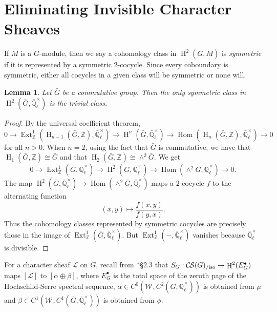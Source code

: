 \documentclass[10pt]{amsart}
\theoremstyle{plain}
\newtheorem{lemma}[theorem]{Lemma}
\theoremstyle{definition}
\newcommand{\ZZ}{{\mathbb{Z}}}
\newcommand{\EE}{\mathbb{\bar Q}_\ell}
\newcommand{\EEx}{\EE^\times}
\newcommand{\Weil}[1]{\mathcal{W}_{#1}}
\DeclareMathOperator{\Hom}{Hom}
\DeclareMathOperator{\Ext}{Ext}
\DeclareMathOperator{\Hh}{H}
\newcommand{\cs}[1]{{\mathcal{#1}}}
\newcommand{\CS}{{\mathcal{C\hskip-0.8pt S}}}
\newcommand{\CSiso}[1]{\CS(#1)_{/\text{iso}}}
\newcommand{\bG}{\bar{G}}
\begin{document}

\section{Eliminating Invisible Character Sheaves}\label{sec:defect}

If $M$ is a $\bG$-module, then we say a cohomology class in $\Hh^2(\bG, M)$ is \emph{symmetric} if it is represented
by a symmetric $2$-cocycle.  Since every coboundary is symmetric, either all cocycles in a given class will be symmetric
or none will.

\begin{lemma} \label{lem:symtriv}
Let $\bG$ be a commutative group.  Then the only symmetric class in $\Hh^2(\bG, \EEx)$ is the trivial class.
\end{lemma}

\begin{proof}
By the universal coefficient theorem,
\[
0 \to \Ext^1_\ZZ(\Hh_{n-1}(\bG, \ZZ), \EEx) \to \Hh^n(\bG, \EEx) \to \Hom(\Hh_n(\bG, \ZZ), \EEx) \to 0
\]
for all $n > 0$.  When $n = 2$, using the fact that $\bG$ is commutative, we have that $\Hh_1(\bG, \ZZ) \cong \bG$
and that $\Hh_2(\bG, \ZZ) \cong \wedge^2 \bG$. We get
\[
0 \to \Ext^1_\ZZ(\bG, \EEx) \to \Hh^2(\bG, \EEx) \to \Hom(\wedge^2 \bG, \EEx) \to 0.
\]
The map $\Hh^2(\bG, \EEx) \to \Hom(\wedge^2 \bG, \EEx)$ maps a $2$-cocycle $f$ to the alternating function
\[
(x,y) \mapsto \frac{f(x,y)}{f(y,x)}.
\]
Thus the cohomology classes represented by symmetric cocycles are precisely those in the image of $\Ext^1_\ZZ(\bG, \EEx)$.
But $\Ext^1_\ZZ(-, \EEx)$ vanishes because $\EEx$ is divisible.
\end{proof}

For a character sheaf $\cs{L}$ on $G$, recall from \cite{cunningham-roe:13a}*{\S 2.3} that $S_G : \CSiso{G} \to \Hh^2(E_G^\bullet)$ maps
$[\cs{L}]$ to $[\alpha \oplus \beta]$, where $E_G^\bullet$ is the total space of the zeroth page
of the Hochschild-Serre spectral sequence, $\alpha \in C^0(\Weil{}, C^2(\bG, \EEx))$ is obtained from $\mu$ and
$\beta \in C^1(\Weil{}, C^1(\bG, \EEx))$ is obtained from $\phi$.
\end{document}
